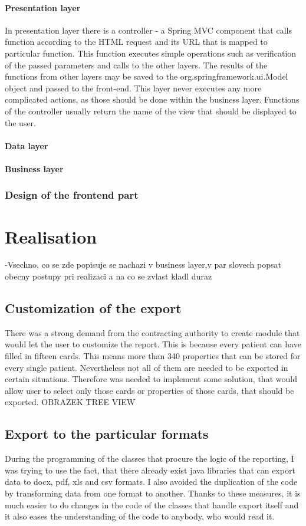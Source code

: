 \documentclass[thesis=B,english]{FITthesis}[2012/10/20]
\begin{document}
\subsubsection{Presentation layer}
In presentation layer there is a controller - a Spring MVC component that calls function according to the  HTML request and its URL that is mapped to particular function. This function executes simple operations such as verification of the passed parameters and calls to the other layers. The results of the functions from other layers may be saved to the org.springframework.ui.Model object and passed to the front-end. This layer never executes any more complicated actions, as those should be done within the business layer. Functions of the controller usually return the name of the view that should be displayed to the user.
\subsubsection{Data layer}
\subsubsection{Business layer}
\subsection{Design of the frontend part}

\chapter{Realisation}
-Vsechno, co se zde popisuje se nachazi v business layer,v par slovech
popsat obecny postupy pri realizaci a na co se zvlast kladl duraz
\section{Customization of the export}
There was a strong demand from the contracting authority to create module that would  let the user to customize the report. This is because every patient can have filled in fifteen cards. This means more than 340 properties that can be stored for every single patient. Nevertheless not all of them are needed to be exported in certain situations. Therefore was needed to implement some solution, that would allow user to select only those cards or properties of those cards, that should be exported.
OBRAZEK TREE VIEW
\section{Export to the particular formats}
During the  programming of the classes that procure the logic of the reporting, I was trying to use the fact, that there already exist java libraries that can export data to docx, pdf, xls and csv formats. I also avoided the duplication of the code by transforming data from one format to another. Thanks to these measures, it is much easier to do changes in the code of the classes that handle export itself and it also eases the understanding of the code to anybody, who would read it.
\end{document}
